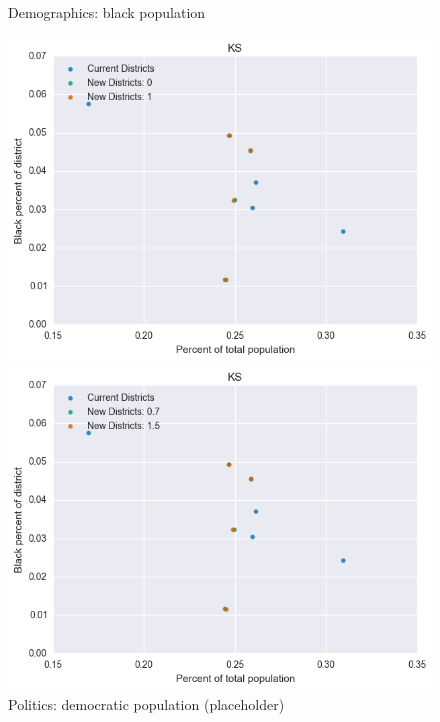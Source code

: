\begin{figure}[htb!] \centering
\caption{ Demographics: black population }
\includegraphics[width=4.5in]{../analysis/KS/analysis_scatter.png}
\caption{ Politics: democratic population (placeholder)}
\includegraphics[width=4.5in]{../analysis/KS/analysis_scatter2.png}
\end{figure}

\clearpage
\newpage


